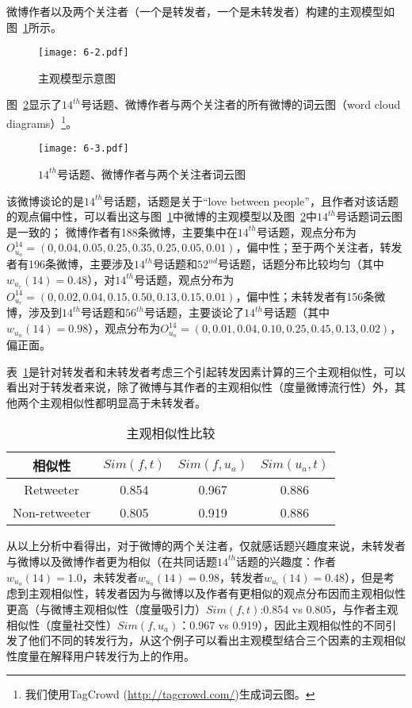 微博作者以及两个关注者（一个是转发者，一个是未转发者）构建的主观模型如图~\ref{fig6-2}所示。

\begin{figure}[htb]
\centering
\texttt{[image: 6-2.pdf]}
\caption{主观模型示意图}
\label{fig6-2}
\end{figure}

图~\ref{fig6-3}显示了$ 14^{th} $号话题、微博作者与两个关注者的所有微博的词云图（word cloud diagrams）\footnote{我们使用TagCrowd (\url{http://tagcrowd.com/})生成词云图。}。

\begin{figure}[htb]
\centering
\texttt{[image: 6-3.pdf]}
\caption{$ 14^{th} $号话题、微博作者与两个关注者词云图}
\label{fig6-3}
\end{figure}

该微博谈论的是$ 14^{th} $号话题，话题是关于“love between people”，且作者对该话题的观点偏中性，可以看出这与图~\ref{fig6-2}中微博的主观模型以及图~\ref{fig6-3}中$ 14^{th} $号话题词云图是一致的；
微博作者有188条微博，主要集中在$ 14^{th} $号话题，观点分布为$O_{u_{a}}^{14} =( 0, 0.04, 0.05, 0.25, 0.35, 0.25, 0.05,  0.01 )$，偏中性；至于两个关注者，转发者有196条微博，主要涉及$ 14^{th} $号话题和$ 52^{nd} $号话题，话题分布比较均匀（其中$ w_{u_{r}}(14)=0.48 $），对$ 14^{th} $号话题，观点分布为$O_{u_{r}}^{14} =( 0, 0.02, 0.04, 0.15, 0.50, 0.13,  0.15,  0.01)$，偏中性；未转发者有156条微博，涉及到$ 14^{th} $号话题和$ 56^{th} $号话题，主要谈论了$ 14^{th} $号话题（其中$ w_{u_{n}}(14)=0.98 $），观点分布为$O_{u_{n}}^{14} =( 0, 0.01, 0.04, 0.10, 0.25, 0.45, 0.13, 0.02)$，偏正面。

表~\ref{tab6-4}是针对转发者和未转发者考虑三个引起转发因素计算的三个主观相似性，可以看出对于转发者来说，除了微博与其作者的主观相似性（度量微博流行性）外，其他两个主观相似性都明显高于未转发者。

\begin{table}[htp]
\centering
\caption{主观相似性比较}
\label{tab6-4}
\begin{tabular}{|c|c|c|c|}
\hline
相似性 & $ Sim(f,t) $ & $ Sim(f,u_a)  $ & $ Sim(u_a,t)  $\\
\hline
Retweeter & 0.854 & 0.967 & 0.886\\
\hline
Non-retweeter & 0.805 & 0.919 & 0.886\\
\hline
\end{tabular}
\end{table} 

从以上分析中看得出，对于微博的两个关注者，仅就感话题兴趣度来说，未转发者与微博以及微博作者更为相似（在共同话题$ 14^{th} $话题的兴趣度：作者$ w_{u_{a}}(14)=1.0 $，未转发者$ w_{u_{n}}(14)=0.98 $，转发者$ w_{u_{r}}(14)=0.48 $），但是考虑到主观相似性，转发者因为与微博以及作者有更相似的观点分布因而主观相似性更高（与微博主观相似性（度量吸引力）$ Sim(f,t)$:0.854 vs 0.805，与作者主观相似性（度量社交性）$ Sim(f,u_a)  $：0.967 vs 0.919），因此主观相似性的不同引发了他们不同的转发行为，从这个例子可以看出主观模型结合三个因素的主观相似性度量在解释用户转发行为上的作用。

